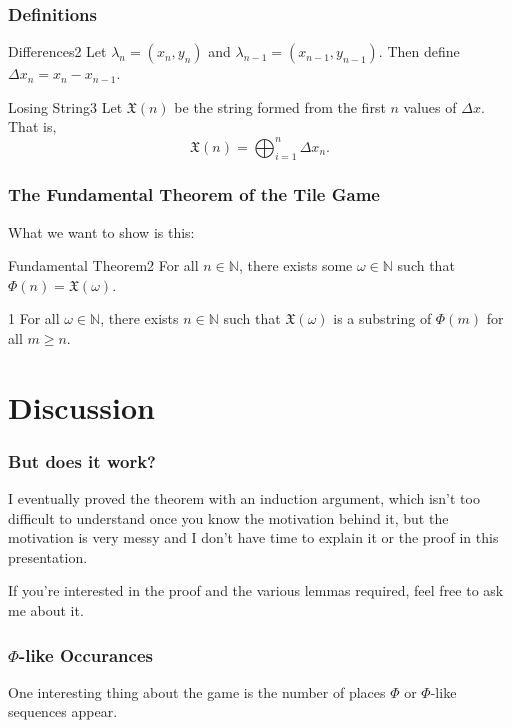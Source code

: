 \documentclass[11pt, letterpaper]{beamer}
\renewenvironment{theorem}[2]{\begin{theo}{#1}{#2}}{\end{theo}}
\renewenvironment{definition}[2]{\begin{dfn}{#1}{#2}}{\end{dfn}}
\renewenvironment{corollary}[2]{\begin{crl}{#1}{#2}}{\end{crl}}
\begin{document}
\begin{frame}
	\frametitle{Definitions}
	\begin{definition}{Differences}{2}
		Let $\lambda_n=(x_n,y_n)$ and $\lambda_{n-1}=(x_{n-1},y_{n-1})$. Then define $\Delta x_n=x_n-x_{n-1}$.
	\end{definition}
	\pause
	\begin{definition}{Losing String}{3}
		Let $\mathfrak{X}(n)$ be the string formed from the first $n$ values of $\Delta x$. That is,
		\[
			\mathfrak{X} (n)=\bigoplus_{i=1}^n \Delta x_n
		.\]
	\end{definition}
\end{frame}

\begin{frame}
	\frametitle{The Fundamental Theorem of the Tile Game}
	What we want to show is this:
	\pause
	\begin{theorem}{Fundamental Theorem}{2}
		For all $n\in\mathbb{N}$, there exists some $\omega \in\mathbb{N}$ such that $\Phi (n)=\mathfrak{X}(\omega  )$.
	\end{theorem}
	\pause
	\begin{corollary}{}{1}
		For all $\omega \in\mathbb{N}$, there exists $n\in\mathbb{N}$ such that $\mathfrak{X}(\omega )$ is a substring of $\Phi (m)$ for all $m\geq n$.
	\end{corollary}
\end{frame}

\section{Discussion}
\begin{frame}
	\frametitle{But does it work?}
	\pause

	I eventually proved the theorem with an induction argument, which isn't too difficult to understand once you know the motivation behind it, but the motivation is very messy and I don't have time to explain it or the proof in this presentation.
	\pause

	If you're interested in the proof and the various lemmas required, feel free to ask me about it.
\end{frame}

\begin{frame}
	\frametitle{$\Phi $-like Occurances}
	One interesting thing about the game is the number of places $\Phi $ or $\Phi $-like sequences appear.
\end{frame}
\end{document}

